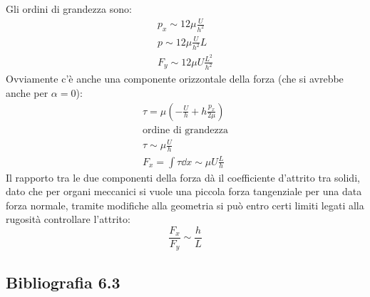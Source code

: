 Gli ordini di grandezza sono:
%
	\begin{equation*}
		\begin{gathered}
			p_x \sim 12 \mu \frac{U}{h^2}\\
			p \sim 12 \mu \frac{U}{h^2} L\\
			F_y \sim 12 \mu U \frac{L^2}{h^2}
		\end{gathered}
	\end{equation*}
%
Ovviamente c'è anche una componente orizzontale della forza (che si avrebbe anche per $\alpha = 0$):
%
	\begin{equation*}
		\begin{gathered}
			\tau = \mu \left( - \frac{U}{h} + h \frac{p_x}{2 \mu} \right)\\
			\text{ordine di grandezza}\\
			\tau \sim \mu \frac{U}{h}\\
			F_x = \int \tau \dd{x} \sim \mu U \frac{L}{h}
		\end{gathered}
	\end{equation*}
%
Il rapporto tra le due componenti della forza dà il coefficiente d'attrito tra solidi, dato che per organi meccanici si vuole una piccola forza tangenziale per una data forza normale, tramite modifiche alla geometria si può entro certi limiti legati alla rugosità controllare l'attrito:		
%
	\begin{equation*}
		\frac{F_x}{F_y} \sim \frac{h}{L}
	\end{equation*}
%

\subsection*{Bibliografia 6.3}
\cite[Cap.\ 9.2]{PnueliGutfinger}